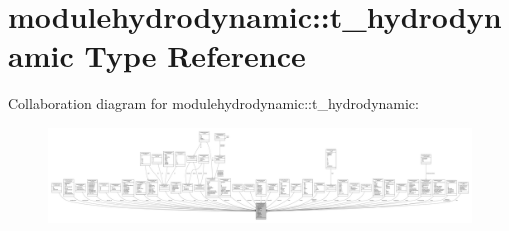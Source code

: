 \hypertarget{structmodulehydrodynamic_1_1t__hydrodynamic}{}\section{modulehydrodynamic\+:\+:t\+\_\+hydrodynamic Type Reference}
\label{structmodulehydrodynamic_1_1t__hydrodynamic}


Collaboration diagram for modulehydrodynamic\+:\+:t\+\_\+hydrodynamic\+:\nopagebreak
\begin{figure}[H]
\begin{center}
\leavevmode
\includegraphics[width=350pt]{structmodulehydrodynamic_1_1t__hydrodynamic__coll__graph}
\end{center}
\end{figure}
